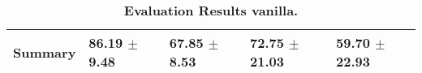 \begin{table}[htb]
{\begin{tabular}{lllll}
\midrule
\textbf{Summary                                  } &        \phantom{0}86.19 $\pm$ \phantom{0}9.48 &            \phantom{0}67.85 $\pm$ \phantom{0}8.53 &                  \phantom{0}72.75 $\pm$ 21.03 &                  \phantom{0}59.70 $\pm$ 22.93 \\
\bottomrule
\end{tabular}%
}
\caption{\textbf{Evaluation Results vanilla.}}
\label{tab:eval-results}
\end{table}


